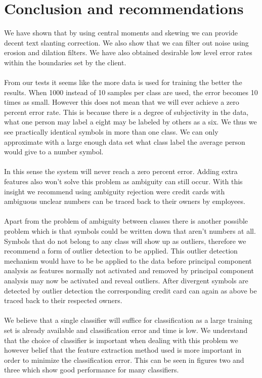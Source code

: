 \documentclass[%
        compressed,
        final,
        notitlepage,
        narroweqnarray,
        inline,
        twoside,
        ]{ieee}
\begin{document}
\section{Conclusion and recommendations}
We have shown that by using central moments and skewing we can provide decent
text slanting correction. We also show that we can filter out noise using
erosion and dilation filters. We have also obtained desirable low level error
rates within the boundaries set by the client.\\\\
From our tests it seems like the more data is used for training the better the
results. When 1000 instead of 10 samples per class are used, the error becomes
10 times as small. However this does not mean that we will ever achieve a zero percent error rate. This is because there is a degree of subjectivity in the data, what one person may label a eight may be labeled by others as a six. We thus we see practically identical symbols in more than one class. We can only approximate with a large enough data set what class label the average person would give to a number symbol. \\\\
In this sense the system will never reach a zero percent error. Adding extra features also won't solve this problem as ambiguity can still occur. With this insight we recommend using ambiguity rejection were credit cards with ambiguous unclear numbers can be traced back to their owners by employees. \\\\
Apart from the problem of ambiguity between classes there is another possible problem which is that symbols could be written down that aren't numbers at all. Symbols that do not belong to any class will show up as outliers, therefore we recommend a form of outlier detection to be applied. This outlier detection mechanism would have to be be applied to the data before principal component analysis as features normally not activated and removed by principal component analysis may now be activated and reveal outliers. After divergent symbols are detected by outlier detection the corresponding credit card can again as above be traced back to their respected owners.\\\\
We believe that a single classifier will suffice for classification as a large training set is already available and classification error and time is low. We understand that the choice of classifier is important when dealing with this problem we however belief that the feature extraction method used is more important in order to minimize the classification error. This can be seen in figures two and three which show good performance for many classifiers. \\\\
\end{document}
